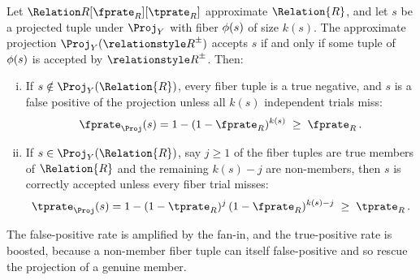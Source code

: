 \documentclass[ ../main.tex]{subfiles}
\begin{document}
\begin{theorem}
\label{thm:project}
Let $\ARelation{R}[\fprate_R][\tprate_R]$ approximate $\Relation{R}$, and let
$s$ be a projected tuple under $\Proj_Y$ with fiber $\phi(s)$ of size $k(s)$.
The approximate projection $\Proj_Y(\ARelation{R})$ accepts $s$ if and only if
some tuple of $\phi(s)$ is accepted by $\ARelation{R}$. Then:
\begin{enumerate}[(i)]
    \item If $s \notin \Proj_Y(\Relation{R})$, every fiber tuple is a true
    negative, and $s$ is a false positive of the projection unless all $k(s)$
    independent trials miss:
    \begin{equation}
        \fprate_\Proj(s) = 1 - (1-\fprate_R)^{k(s)} \;\geq\; \fprate_R\,.
    \end{equation}
    \item If $s \in \Proj_Y(\Relation{R})$, say $j \geq 1$ of the fiber tuples
    are true members of $\Relation{R}$ and the remaining $k(s)-j$ are non-members,
    then $s$ is correctly accepted unless every fiber trial misses:
    \begin{equation}
        \tprate_\Proj(s) = 1 - (1-\tprate_R)^{j}\,(1-\fprate_R)^{k(s)-j}
        \;\geq\; \tprate_R\,.
    \end{equation}
\end{enumerate}
The false-positive rate is amplified by the fan-in, and the true-positive rate is
boosted, because a non-member fiber tuple can itself false-positive and so rescue
the projection of a genuine member.
\end{theorem}
\end{document}
